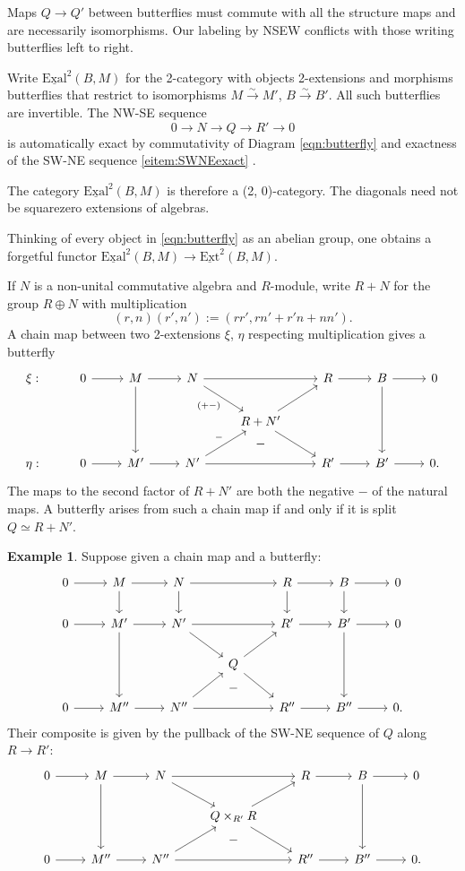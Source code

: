 \documentclass[11pt,reqno]{amsart}
\theoremstyle{definition}
\newtheorem{example}[theorem]{Example}
\newcommand{\EExt}{\underline{\textrm{Ext}}}
\newcommand{\EExal}{\underline{\textrm{Exal}}}
\newcommand{\longsimeq}{\overset{\sim}{\longrightarrow}}
\begin{document}
Maps $Q \to Q'$ between butterflies must commute with all the structure maps and are necessarily isomorphisms. Our labeling by NSEW conflicts with those writing butterflies left to right. 

Write $\EExal^2(B, M)$ for the 2-category with objects 2-extensions and morphisms butterflies that restrict to isomorphisms $M \longsimeq M'$, $B \longsimeq B'$. All such butterflies are invertible. The NW-SE sequence
\[0 \to N \to Q \to R' \to 0\]
is automatically exact by commutativity of Diagram \eqref{eqn:butterfly} and exactness of the SW-NE sequence \eqref{eitem:SWNEexact} \cite[Proposition 3]{wisebutterflies}. 

The category $\EExal^2(B, M)$ is therefore a (2, 0)-category. The diagonals need not be squarezero extensions of algebras.


Thinking of every object in \eqref{eqn:butterfly} as an abelian group, one obtains a forgetful functor $\EExal^2(B, M) \to \EExt^2(B, M)$. 


If $N$ is a non-unital commutative algebra and $R$-module, write $R + N$ for the group $R \oplus N$ with multiplication
\[(r, n)(r', n') := (rr', rn' + r'n + nn').\]
A chain map between two 2-extensions $\xi$, $\eta$ respecting multiplication gives a butterfly \[\begin{tikzcd}
\xi :   &0 \ar[r]      &M \ar[r] \ar[dd]  &N  \ar[dr, "(+-)", swap] \ar[rr]  &   &R \ar[r]  &B \ar[dd] \ar[r]  &0      \\
        &       &   &   &R + N' \ar[ur] \ar[dr]    \\
\eta :  &0 \ar[r]      &M' \ar[r] &N' \ar[ur, "-"] \ar[rr] &\phantom{a} \ar[from=u, phantom, "-"]   &R' \ar[r] &B' \ar[r] &0.  
\end{tikzcd}\]
The maps to the second factor of $R + N'$ are both the negative $-$ of the natural maps. A butterfly arises from such a chain map if and only if it is split $Q \simeq R + N'$. 


\begin{example}

Suppose given a chain map and a butterfly:
\[\begin{tikzcd}
0 \ar[r] &M \ar[r] \ar[d] &N \ar[rr] \ar[d] & &R \ar[r] \ar[d] &B \ar[r] \ar[d] &0 \\
0\ar[r] &M'\ar[r] \ar[dd] &N'\ar[rr] \ar[dr] & &R'\ar[r] &B'\ar[r] \ar[dd] &0 \\
 & & &Q \ar[ur] \ar[dr] \\
0\ar[r] &M''\ar[r] &N''\ar[rr] \ar[ur] &\phantom{a} \ar[from=u, phantom, "-"]&R''\ar[r] &B''\ar[r] &0.
\end{tikzcd}\]
Their composite is given by the pullback of the SW-NE sequence of $Q$ along $R \to R'$:
\[\begin{tikzcd}
0\ar[r] &M \ar[r] \ar[dd] &N \ar[rr] \ar[dr] & &R \ar[r] &B \ar[r] \ar[dd] &0 \\
 & & &Q \times_{R'} R \ar[ur] \ar[dr] \\
0\ar[r] &M''\ar[r] &N''\ar[rr] \ar[ur] &\phantom{a} \ar[from=u, phantom, "-"]&R''\ar[r] &B''\ar[r] &0.
\end{tikzcd}\]


\end{example}
\end{document}
